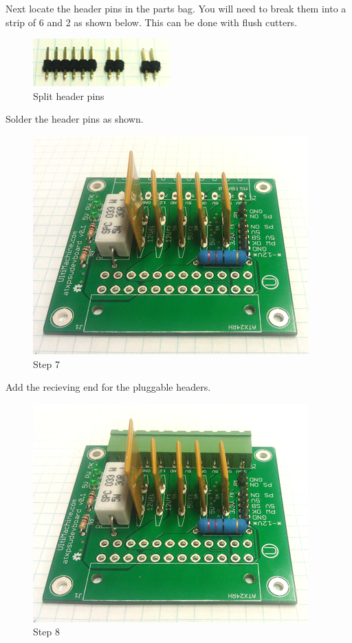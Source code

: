 Next locate the header pins in the parts bag. You will need to break
them into a strip of 6 and 2 as shown below. This can be done with flush
cutters.

\begin{figure}[H]
\centering
\includegraphics{./png/header-break.png}
\caption{Split header pins}
\end{figure}

Solder the header pins as shown.

\begin{figure}[H]
\centering
\includegraphics{./png/step-07.png}
\caption{Step 7}
\end{figure}

Add the recieving end for the pluggable headers.

\begin{figure}[H]
\centering
\includegraphics{./png/step-08.png}
\caption{Step 8}
\end{figure}

